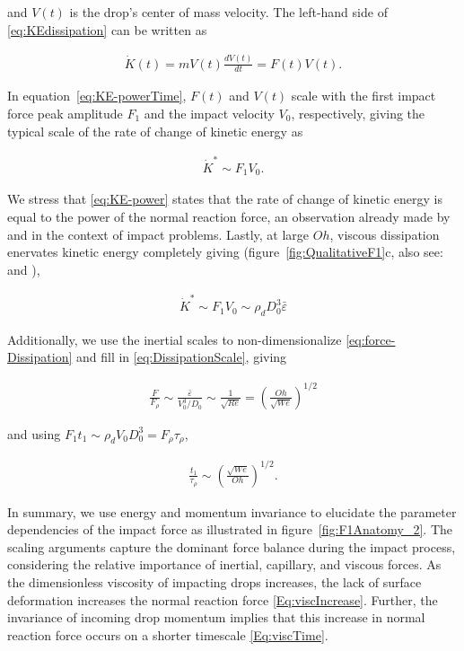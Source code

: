\documentclass{jfm}
\begin{document}
\noindent and $V(t)$ is the drop's center of mass velocity. The left-hand side of \eqref{eq:KEdissipation} can be written as

\begin{align}\label{eq:KE-powerTime}
	\dot{K}(t) = mV(t)\frac{dV(t)}{dt} = F(t)V(t).
\end{align}

\noindent In equation~\eqref{eq:KE-powerTime}, $F(t)$ and $V(t)$ scale with the first impact force peak amplitude $F_1$ and the impact velocity $V_0$, respectively, giving the typical scale of the rate of change of kinetic energy as

\begin{align}\label{eq:KE-power}
	\dot{K}^* \sim F_1V_0.
\end{align}

\noindent We stress that \eqref{eq:KE-power} states that the rate of change of kinetic energy is equal to the power of the normal reaction force, an observation already made by \citet{wagner1932stoss} and \citet{Philippi2016} in the context of impact problems. Lastly, at large $Oh$, viscous dissipation enervates kinetic energy completely giving (figure~\ref{fig:QualitativeF1}c, also see:  \citet{Philippi2016} and \citet{ Wildeman2016}),

\begin{align}\label{eq:force-Dissipation}
	\dot{K}^* \sim F_1V_0 \sim \rho_dD_0^3\bar{\varepsilon}
\end{align}

\noindent Additionally, we use the inertial scales to non-dimensionalize  \eqref{eq:force-Dissipation} and fill in \eqref{eq:DissipationScale}, giving

\begin{align}
	\label{Eq:viscIncrease}
	\frac{F}{F_\rho} \sim \frac{\bar{\varepsilon}}{V_0^3/D_0} \sim \frac{1}{\sqrt{Re}} = \left(\frac{Oh}{\sqrt{We}}\right)^{1/2}
\end{align}

\noindent and using $F_1t_1 \sim \rho_dV_0D_0^3 = F_\rho\tau_\rho$,

\begin{align}
	\label{Eq:viscTime}
	\frac{t_1}{\tau_\rho} \sim \left(\frac{\sqrt{We}}{Oh}\right)^{1/2}.
\end{align}

In summary, we use energy and momentum invariance to elucidate the parameter dependencies of the impact force as illustrated in figure~\ref{fig:F1Anatomy_2}. The scaling arguments capture the dominant force balance during the impact process, considering the relative importance of inertial, capillary, and viscous forces. As the dimensionless viscosity of impacting drops increases, the lack of surface deformation increases the normal reaction force \eqref{Eq:viscIncrease}. Further, the invariance of incoming drop momentum implies that this increase in normal reaction force occurs on a shorter timescale \eqref{Eq:viscTime}.
\end{document}
